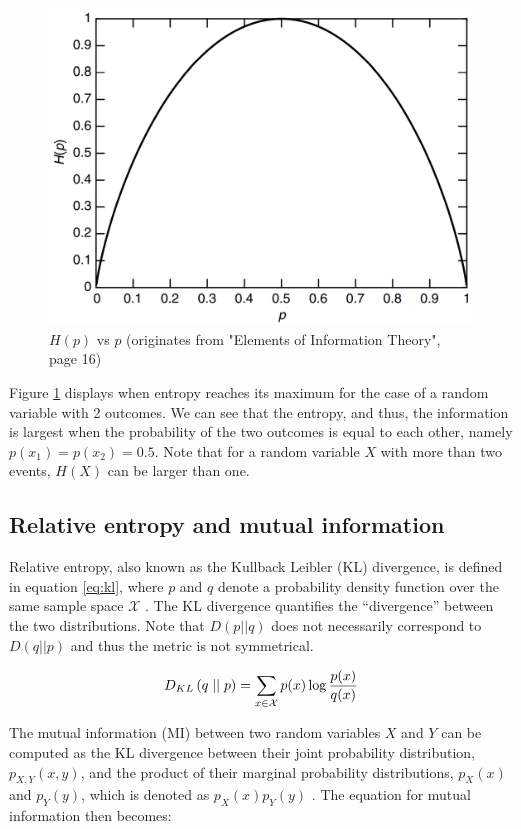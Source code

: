 \begin{figure}[h]
	\centering
	\includegraphics[width=0.4\linewidth]{screenshot005}
	\caption{$H(p)$ vs $p$ (originates from "Elements of Information Theory", page 16)}
	\label{fig:EntropyvsP}
\end{figure}



Figure \ref{fig:EntropyvsP} displays when entropy reaches its maximum for the case of a random variable with 2 outcomes. We can see that the entropy, and thus, the information is largest when the probability of the two outcomes is equal to each other, namely $p(x_1)=p(x_2)=0.5$. Note that for a random variable $X$ with more than two events, $H(X)$ can be larger than one.

\subsection{Relative entropy and mutual information}
Relative entropy, also known as the Kullback Leibler (KL) divergence, is defined in equation \ref{eq:kl}, where $p$ and $q$ denote a probability density function over the same sample space $\mathcal{X}$ \cite{coverELEMENTSINFORMATIONTHEORY}. The KL divergence quantifies the “divergence” between the two distributions. Note that $D(p||q)$ does not necessarily correspond to $D(q||p)$ and thus the metric is not symmetrical.

\begin{equation}
	D_{KL} \left( q \mid \mid p \right) = \sum_{x\in\mathcal{X}}p(x) \log \frac{p(x)}{q(x)} \label{eq:kl}
\end{equation}



The mutual information (MI) between two random variables $X$ and $Y$ can be computed as the KL divergence between their joint probability distribution, $p_{X,Y}(x,y)$, and the product of their marginal probability distributions, $p_X(x)$ and $p_Y(y)$, which is denoted as $p_X(x)p_Y(y)$ \cite{coverELEMENTSINFORMATIONTHEORY}. The equation for mutual information then becomes:

